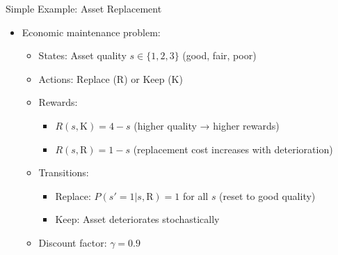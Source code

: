 \documentclass[10pt]{beamer}
\begin{document}
\begin{frame}{Simple Example: Asset Replacement}
    \begin{itemize}
        \item Economic maintenance problem:
        \begin{itemize}
            \item States: Asset quality $s \in \{1,2,3\}$ (good, fair, poor)
            \item Actions: Replace (R) or Keep (K)
            \item Rewards:
            \begin{itemize}
                \item $R(s,\text{K}) = 4-s$ (higher quality → higher rewards)
                \item $R(s,\text{R}) = 1-s$ (replacement cost increases with deterioration)
            \end{itemize}
            \item Transitions:
            \begin{itemize}
                \item Replace: $P(s'=1|s,\text{R})=1$ for all $s$ (reset to good quality)
                \item Keep: Asset deteriorates stochastically
            \end{itemize}
            \item Discount factor: $\gamma = 0.9$
        \end{itemize}
    \end{itemize}
\end{frame}
\end{document}
